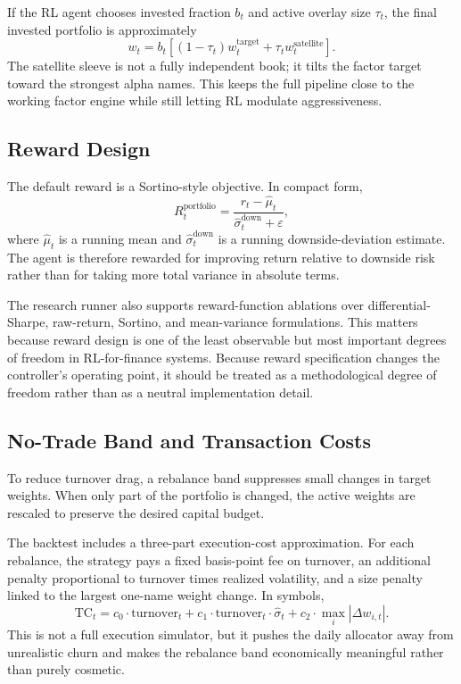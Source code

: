 \documentclass[10pt,twocolumn]{article}
\begin{document}
If the RL agent chooses invested fraction $b_t$ and active overlay size $\tau_t$,
the final invested portfolio is approximately
\[
w_t =
b_t \left[(1-\tau_t)w_t^{\text{target}} + \tau_t w_t^{\text{satellite}}\right].
\]
The satellite sleeve is not a fully independent book; it tilts the factor target
toward the strongest alpha names. This keeps the full pipeline close to the
working factor engine while still letting RL modulate aggressiveness.

\subsection{Reward Design}

The default reward is a Sortino-style objective. In compact form,
\[
R_t^{\mathrm{portfolio}}
= \frac{r_t - \hat{\mu}_t}{\hat{\sigma}^{\mathrm{down}}_t + \varepsilon},
\]
where $\hat{\mu}_t$ is a running mean and
$\hat{\sigma}^{\mathrm{down}}_t$ is a running downside-deviation estimate. The
agent is therefore rewarded for improving return relative to downside risk
rather than for taking more total variance in absolute terms.

The research runner also supports reward-function ablations over
differential-Sharpe, raw-return, Sortino, and mean-variance formulations. This
matters because reward design is one of the least observable but most important
degrees of freedom in RL-for-finance systems. Because reward specification
changes the controller's operating point, it should be treated as a
methodological degree of freedom rather than as a neutral implementation detail.

\subsection{No-Trade Band and Transaction Costs}

To reduce turnover drag, a rebalance band suppresses small changes in target
weights. When only part of the portfolio is changed, the active weights are
rescaled to preserve the desired capital budget.

The backtest includes a three-part execution-cost approximation. For each
rebalance, the strategy pays a fixed basis-point fee on turnover, an additional
penalty proportional to turnover times realized volatility, and a size penalty
linked to the largest one-name weight change. In symbols,
\[
\mathrm{TC}_t
= c_0 \cdot \mathrm{turnover}_t
+ c_1 \cdot \mathrm{turnover}_t \cdot \hat{\sigma}_t
+ c_2 \cdot \max_i |\Delta w_{i,t}|.
\]
This is not a full execution simulator, but it pushes the daily allocator away
from unrealistic churn and makes the rebalance band economically meaningful
rather than purely cosmetic.
\end{document}
